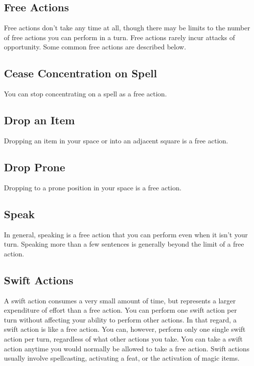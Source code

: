 \subsection{Free Actions}

				
Free actions don't take any time at all, though there may be limits to the number of free actions you can perform in a turn. Free actions rarely incur attacks of opportunity. Some common free actions are described below.
				
\subsection{Cease Concentration on Spell}

				
You can stop concentrating on a spell as a free action.
				
\subsection{Drop an Item}

				
Dropping an item in your space or into an adjacent square is a free action.
				
\subsection{Drop Prone}

				
Dropping to a prone position in your space is a free action.
				
\subsection{Speak}

				
In general, speaking is a free action that you can perform even when it isn't your turn. Speaking more than a few sentences is generally beyond the limit of a free action.
				
\subsection{Swift Actions}

				
A swift action consumes a very small amount of time, but represents a larger expenditure of effort than a free action. You can perform one swift action per turn without affecting your ability to perform other actions. In that regard, a swift action is like a free action. You can, however, perform only one single swift action per turn, regardless of what other actions you take. You can take a swift action anytime you would normally be allowed to take a free action. Swift actions usually involve spellcasting, activating a feat, or the activation of magic items.
				
